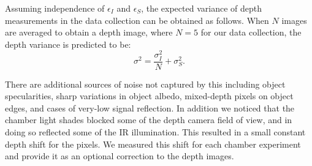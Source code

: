 Assuming independence of $\epsilon_I$ and $\epsilon_S$, the expected variance of depth measurements in the data collection can be obtained as follows.  When $N$ images are averaged to obtain a depth image, where $N=5$ for our data collection, the depth variance is predicted to be:
\begin{equation}
	\sigma^2 = \frac{\sigma_I^2}{N} + \sigma_S^2.\label{eq:sigma}
\end{equation}

There are additional sources of noise not captured by this including object specularities, sharp variations in object albedo, mixed-depth pixels on object edges, and cases of very-low signal reflection.  In addition we noticed that the chamber light shades blocked some of the depth camera field of view, and in doing so reflected some of the IR illumination.  This resulted in a small constant depth shift for the pixels.  We measured this shift for each chamber experiment and provide it as an optional correction to the depth images.




